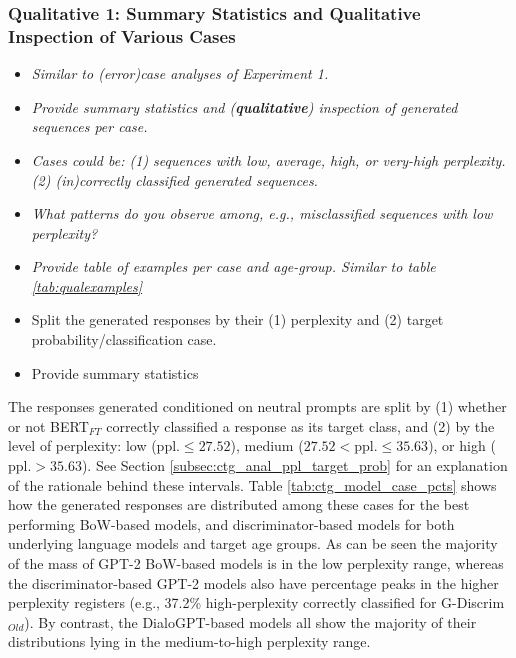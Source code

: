 \subsubsection{Qualitative 1: Summary Statistics and Qualitative Inspection of Various Cases}

\begin{itemize}
    \item \textit{Similar to (error)case analyses of Experiment 1.}
    
    \item \textit{Provide summary statistics and (\textbf{qualitative}) inspection of generated sequences per case.}
    
    \item \textit{Cases could be: (1) sequences with low, average, high, or very-high perplexity. (2) (in)correctly classified generated sequences.}
    
    \item \textit{What patterns do you observe among, e.g., misclassified sequences with low perplexity?}
    
    \item \textit{Provide table of examples per case and age-group. Similar to table \ref{tab:qualexamples}}
\end{itemize}


\begin{itemize}
    \item Split the generated responses by their (1) perplexity and (2) target probability/classification case.
    \item Provide summary statistics 
\end{itemize}

The responses generated conditioned on neutral prompts are split by (1) whether or not BERT$_{FT}$ correctly classified a response as its target class, and (2) by the level of perplexity: low ($\text{ppl.} \leq 27.52$), medium ($27.52 < \text{ppl.} \leq 35.63$), or high ($\text{ppl.} > 35.63$). See Section \ref{subsec:ctg_anal_ppl_target_prob} for an explanation of the rationale behind these intervals. Table \ref{tab:ctg_model_case_pcts} shows how the generated responses are distributed among these cases for the best performing BoW-based models, and discriminator-based models for both underlying language models and target age groups. As can be seen the majority of the mass of GPT-2 BoW-based models is in the low perplexity range, whereas the discriminator-based GPT-2 models also have percentage peaks in the higher perplexity registers (e.g., 37.2\% high-perplexity correctly classified for G-Discrim$_{Old}$). By contrast, the DialoGPT-based models all show the majority of their distributions lying in the medium-to-high perplexity range.

